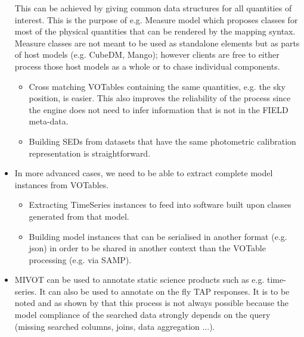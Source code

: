 \begin{itemize}
  This can be achieved by giving  common data structures for all 
  quantities of interest. This is the purpose of e.g. Measure model 
  which proposes classes for most of the physical quantities that can 
  be rendered by the mapping syntax. Measure classes are not meant to 
  be used as standalone elements but as parts of host models 
  (e.g. CubeDM, Mango);
  however clients are free to either process those host models as a
  whole or to chase individual components.
    \begin{itemize}
      \item Cross matching VOTables containing the same quantities, e.g. the sky position, is easier.
            This also improves the reliability of the process since the engine does not need to infer information that is not in the FIELD meta-data.
      \item Building SEDs from datasets that have the same photometric calibration representation is straightforward.
   \end{itemize}          

  \item In more advanced cases, we need to be able to extract complete model instances from VOTables.
    \begin{itemize}
      \item Extracting  TimeSeries instances to feed into software built upon classes generated from that model.
      \item Building model instances that can be serialised in another format (e.g. json) in order to be shared in another context than 
            the VOTable processing (e.g. via SAMP).
   \end{itemize}         
    
   \item MIVOT can be used to annotate static science products such as e.g. time-series. It can also be used to annotate 
   on the fly TAP responses.
   It is to be noted and as shown by \cite{2201.01732}  that this process is not always 
   possible because the model compliance of the searched data strongly depends 
   on the query (missing searched columns, joins, data aggregation ...). 
   
    
\end{itemize} 

